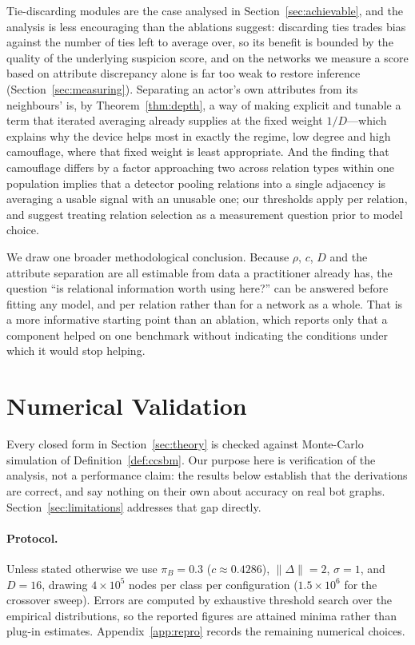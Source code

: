 \documentclass[onecolumn,pdflatex,sn-basic,Numbered]{sn-jnl}
\theoremstyle{thmstyleone}
\theoremstyle{thmstylethree}
\begin{document}
Tie-discarding modules are the case analysed in Section~\ref{sec:achievable}, and the
analysis is less encouraging than the ablations suggest: discarding ties trades bias
against the number of ties left to average over, so its benefit is bounded by the quality of the underlying suspicion score, and on the networks we measure a score
based on attribute discrepancy alone is far too weak to restore inference
(Section~\ref{sec:measuring}). Separating an actor's own attributes from its
neighbours' is, by Theorem~\ref{thm:depth}, a way of making explicit and tunable a
term that iterated averaging already supplies at the fixed weight $1/D$---which
explains why the device helps most in exactly the regime, low degree and high
camouflage, where that fixed weight is least appropriate. And the finding that
camouflage differs by a factor approaching two across relation types within one
population implies that a detector pooling relations into a single adjacency is
averaging a usable signal with an unusable one; our thresholds apply per relation, and
suggest treating relation selection as a measurement question prior to model choice.

We draw one broader methodological conclusion. Because $\rho$, $c$, $D$ and the
attribute separation are all estimable from data a practitioner already has, the
question ``is relational information worth using here?'' can be answered before
fitting any model, and per relation rather than for a network as a whole. That is a
more informative starting point than an ablation, which reports only that a component
helped on one benchmark without indicating the conditions under which it would stop
helping.



\section{Numerical Validation}
\label{sec:validation}

Every closed form in Section~\ref{sec:theory} is checked against Monte-Carlo
simulation of Definition~\ref{def:ccsbm}. Our purpose here is verification of the
analysis, not a performance claim: the results below establish that the derivations
are correct, and say nothing on their own about accuracy on real bot graphs.
Section~\ref{sec:limitations} addresses that gap directly.

\paragraph{Protocol.}
Unless stated otherwise we use $\pi_B = 0.3$ ($c \approx 0.4286$),
$\|\Delta\| = 2$, $\sigma = 1$, and $D = 16$, drawing $4\times 10^5$ nodes per class
per configuration ($1.5 \times 10^6$ for the crossover sweep). Errors are computed
by exhaustive threshold search over the empirical distributions, so the reported
figures are attained minima rather than plug-in estimates.
Appendix~\ref{app:repro} records the remaining numerical choices.
\end{document}
